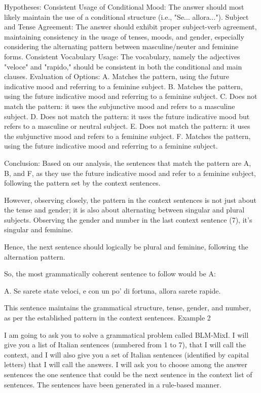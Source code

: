 Hypotheses:
Consistent Usage of Conditional Mood: The answer should most likely maintain the use of a conditional structure (i.e., "Se... allora...").
Subject and Tense Agreement: The answer should exhibit proper subject-verb agreement, maintaining consistency in the usage of tenses, moods, and gender, especially considering the alternating pattern between masculine/neuter and feminine forms.
Consistent Vocabulary Usage: The vocabulary, namely the adjectives "veloce" and "rapido," should be consistent in both the conditional and main clauses.
Evaluation of Options:
A. Matches the pattern, using the future indicative mood and referring to a feminine subject.
B. Matches the pattern, using the future indicative mood and referring to a feminine subject.
C. Does not match the pattern: it uses the subjunctive mood and refers to a masculine subject.
D. Does not match the pattern: it uses the future indicative mood but refers to a masculine or neutral subject.
E. Does not match the pattern: it uses the subjunctive mood and refers to a feminine subject.
F. Matches the pattern, using the future indicative mood and referring to a feminine subject.

Conclusion:
Based on our analysis, the sentences that match the pattern are A, B, and F, as they use the future indicative mood and refer to a feminine subject, following the pattern set by the context sentences.

However, observing closely, the pattern in the context sentences is not just about the tense and gender; it is also about alternating between singular and plural subjects. Observing the gender and number in the last context sentence (7), it’s singular and feminine.

Hence, the next sentence should logically be plural and feminine, following the alternation pattern.

So, the most grammatically coherent sentence to follow would be A:

A. Se sarete state veloci, e con un po' di fortuna, allora sarete rapide.

This sentence maintains the grammatical structure, tense, gender, and number, as per the established pattern in the context sentences.
Example 2

I am going to ask you to solve a grammatical problem called BLM-MixI.  I will give you a list of Italian sentences (numbered from 1 to 7), that I will call the context, and I will also give you a set of Italian sentences (identified by capital letters) that I will call  the answers. I will ask you to choose among the answer sentences the one sentence that could be the next sentence in the context list of sentences. The sentences have been generated in a rule-based manner. 

